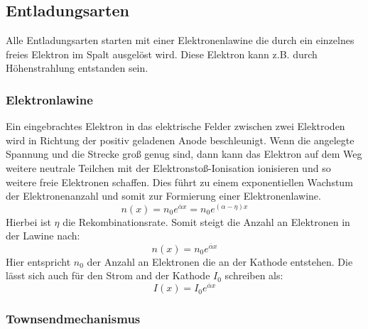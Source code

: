 \subsection{Entladungsarten}
Alle Entladungsarten starten mit einer Elektronenlawine die durch ein einzelnes freies Elektron im Spalt ausgelöst wird. Diese Elektron kann z.B. durch Höhenstrahlung entstanden sein.
\subsubsection{Elektronlawine}
\label{chap:electronlaw}
Ein eingebrachtes Elektron in das elektrische Felder zwischen zwei Elektroden wird in Richtung der positiv geladenen Anode beschleunigt. Wenn die angelegte Spannung und die Strecke groß genug sind, dann kann das Elektron auf dem Weg weitere neutrale Teilchen mit der Elektronstoß-Ionisation ionisieren und so weitere freie Elektronen schaffen. Dies führt zu einem exponentiellen Wachstum der Elektronenanzahl und somit zur Formierung einer Elektronenlawine. \cite{kuffel2000}
\begin{equation}
    n(x) = n_0 e^{\overline{\alpha}x} = n_0 e^{(\alpha - \eta)x}
    \label{eq:electronlaw}
\end{equation}
Hierbei ist \(\eta\) die Rekombinationsrate. Somit steigt die Anzahl an Elektronen in der Lawine nach:
\begin{equation}
    n(x) = n_0e^{\overline{\alpha}x}
\end{equation}
Hier entspricht \(n_0\) der Anzahl an Elektronen die an der Kathode entstehen. Die lässt sich auch für den Strom and der Kathode \(I_0\) schreiben als:
\begin{equation}
    I(x) = I_0e^{\overline{\alpha}x}
\end{equation}

\subsubsection{Townsendmechanismus}

